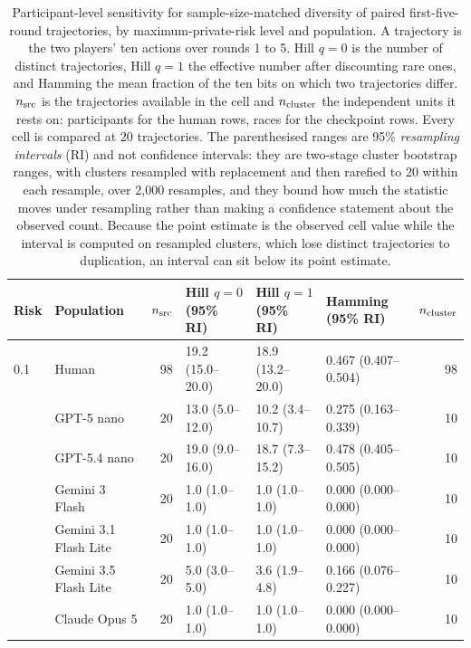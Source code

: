 \documentclass[sigconf,anonymous]{aamas}
\begin{document}
\begin{table}[t]
    \caption{Participant-level sensitivity for sample-size-matched diversity of paired first-five-round
    trajectories, by maximum-private-risk level and population. A trajectory
    is the two players' ten actions over rounds 1 to 5. Hill $q{=}0$ is the
    number of distinct trajectories, Hill $q{=}1$ the effective number after
    discounting rare ones, and Hamming the mean fraction of the ten bits on
    which two trajectories differ. $n_{\rm src}$ is the trajectories
    available in the cell and $n_{\rm cluster}$ the independent units it
    rests on: participants for the human rows, races for the checkpoint rows.
    Every cell is compared at 20 trajectories. The parenthesised ranges are
    95\% \emph{resampling intervals} (RI) and not confidence intervals: they
    are two-stage cluster bootstrap ranges, with clusters resampled with
    replacement and then rarefied to 20 within each resample, over 2{,}000
    resamples, and they bound how much the statistic moves under resampling
    rather than making a confidence statement about the observed count.
    Because the point estimate is the observed cell value while the interval is
    computed on resampled clusters, which lose distinct trajectories to
    duplication, an interval can sit below its point estimate.}
    \label{tab:diversity-rarefaction}
    \centering
    \footnotesize
    \setlength{\tabcolsep}{5pt}
    \begin{tabular}{@{}llrlllr@{}}
        \toprule
        Risk & Population & $n_{\rm src}$ & Hill $q{=}0$ (95\% RI)
        & Hill $q{=}1$ (95\% RI) & Hamming (95\% RI) & $n_{\rm cluster}$ \\
        \midrule
        0.1 & Human & 98 & 19.2 (15.0--20.0) & 18.9 (13.2--20.0) & 0.467 (0.407--0.504) & 98 \\
         & GPT-5 nano & 20 & 13.0 (5.0--12.0) & 10.2 (3.4--10.7) & 0.275 (0.163--0.339) & 10 \\
         & GPT-5.4 nano & 20 & 19.0 (9.0--16.0) & 18.7 (7.3--15.2) & 0.478 (0.405--0.505) & 10 \\
         & Gemini 3 Flash & 20 & 1.0 (1.0--1.0) & 1.0 (1.0--1.0) & 0.000 (0.000--0.000) & 10 \\
         & Gemini 3.1 Flash Lite & 20 & 1.0 (1.0--1.0) & 1.0 (1.0--1.0) & 0.000 (0.000--0.000) & 10 \\
         & Gemini 3.5 Flash Lite & 20 & 5.0 (3.0--5.0) & 3.6 (1.9--4.8) & 0.166 (0.076--0.227) & 10 \\
         & Claude Opus 5 & 20 & 1.0 (1.0--1.0) & 1.0 (1.0--1.0) & 0.000 (0.000--0.000) & 10 \\

\end{tabular}
\end{table}
\end{document}
